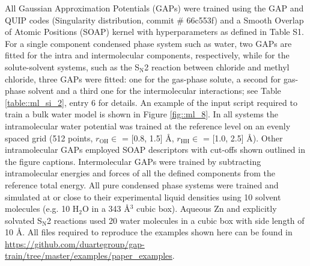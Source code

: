 \documentclass[../../main.tex]{subfiles}
\begin{document}
All Gaussian Approximation Potentials (GAPs) were trained using the GAP and QUIP codes (Singularity distribution, commit \# 66c553f) and a Smooth Overlap of Atomic Positions (SOAP)\cite{Bartok2013} kernel with hyperparameters as defined in Table S1. For a single component condensed phase system such as water, two GAPs are fitted for the intra and intermolecular components, respectively, while for the solute-solvent systems, such as the S${}_\text{N}$2 reaction between chloride and methyl chloride, three GAPs were fitted: one for the gas-phase solute, a second for gas-phase solvent and a third one for the intermolecular interactions; see Table \ref{table::ml_si_2}, entry 6 for details. An example of the input script required to train a bulk water model is shown in Figure \ref{fig::ml_8}. In all systems the intramolecular water potential was trained at the reference level on an evenly spaced grid (512 points, $r_\text{OH} \in$ = [0.8, 1.5] \AA, $r_\text{HH}\in$ = [1.0, 2.5] \AA). Other intramolecular GAPs employed SOAP descriptors with cut-offs shown outlined in the figure captions. Intermolecular GAPs were trained by subtracting intramolecular energies and forces of all the defined components from the reference total energy. All pure condensed phase systems were trained and simulated at or close to their experimental liquid densities using 10 solvent molecules (e.g. 10 H${}_2$O in a 343 \AA${}^3$ cubic box). Aqueous Zn and explicitly solvated S${}_\text{N}$2 reactions used 20 water molecules in a cubic box with side length of 10 \AA. All files required to reproduce the examples shown here can be found in {\url{https://github.com/duartegroup/gap-train/tree/master/examples/paper_examples}}.
\end{document}

